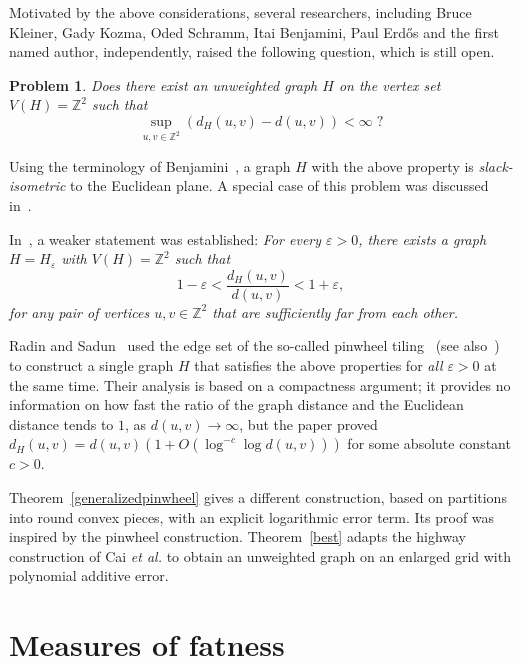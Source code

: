 \documentclass[12pt]{article}
\theoremstyle{plain}
\newtheorem{problem}[theorem]{Problem}
\theoremstyle{definition}
\theoremstyle{remark}
\begin{document}
Motivated by the above considerations, several researchers, including Bruce Kleiner, Gady Kozma, Oded Schramm, Itai Benjamini, Paul Erd\H os and the first named author, independently, raised the following question, which is still open.

\begin{problem}\label{additive}
Does there exist an unweighted graph $H$ on the vertex set $V(H)={\mathbb{Z}}^2$ such that
\[\sup_{u,v\in {\mathbb{Z}}^2}\left(d_H(u,v)-d(u,v)\right)<\infty\;?\]
\end{problem}

Using the terminology of Benjamini~\cite{Be13}, a graph $H$ with the above property is \emph{slack-isometric} to the Euclidean plane. A special case of this problem was discussed in~\cite{Be26}.
\smallskip

In~\cite{PaPS90}, a weaker statement was established: \emph{For every $\varepsilon>0$, there exists a graph $H=H_{\varepsilon}$ with $V(H)={\mathbb{Z}}^2$ such that
\[1-\varepsilon<\frac{d_H(u,v)}{d(u,v)}<1+\varepsilon,\]
for any pair of vertices $u,v\in {\mathbb{Z}}^2$ that are sufficiently far from each other.}
\smallskip

Radin and Sadun~\cite{RaS96} used the edge set of the so-called pinwheel tiling~\cite{Ra94, Ra95} (see also~\cite{CoR98}) to construct a single graph $H$ that satisfies the above properties for \emph{all} $\varepsilon>0$ at the same time. Their analysis is based on a compactness argument; it provides no information on how fast the ratio of the graph distance and the Euclidean distance tends to $1$, as $d(u,v)\rightarrow\infty$, but the paper \cite{CaC26} proved $d_H(u,v)=d(u,v)(1+O(\log^{-c}\log d(u,v)))$ for some absolute constant $c>0$.
\smallskip

Theorem~\ref{generalizedpinwheel} gives a different construction, based on partitions into round convex pieces, with an explicit logarithmic error term. Its proof was inspired by the pinwheel construction. Theorem~\ref{best} adapts the highway construction of Cai \emph{et al.} to obtain an unweighted graph on an enlarged grid with polynomial additive error.

\section{Measures of fatness}\label{sec2}
\end{document}
